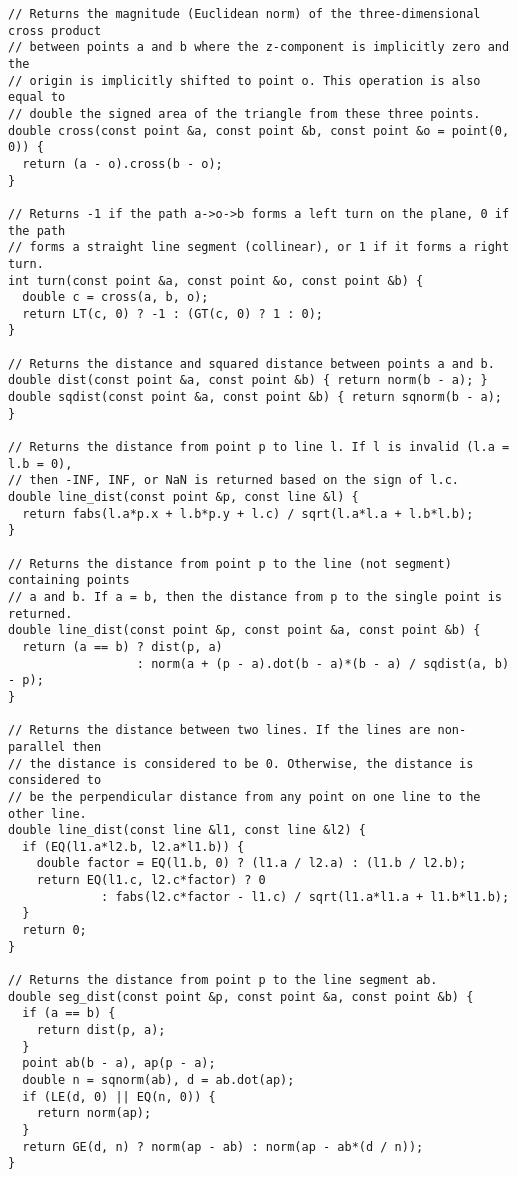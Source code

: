 \begin{lstlisting}
// Returns the magnitude (Euclidean norm) of the three-dimensional cross product
// between points a and b where the z-component is implicitly zero and the
// origin is implicitly shifted to point o. This operation is also equal to
// double the signed area of the triangle from these three points.
double cross(const point &a, const point &b, const point &o = point(0, 0)) {
  return (a - o).cross(b - o);
}

// Returns -1 if the path a->o->b forms a left turn on the plane, 0 if the path
// forms a straight line segment (collinear), or 1 if it forms a right turn.
int turn(const point &a, const point &o, const point &b) {
  double c = cross(a, b, o);
  return LT(c, 0) ? -1 : (GT(c, 0) ? 1 : 0);
}

// Returns the distance and squared distance between points a and b.
double dist(const point &a, const point &b) { return norm(b - a); }
double sqdist(const point &a, const point &b) { return sqnorm(b - a); }

// Returns the distance from point p to line l. If l is invalid (l.a = l.b = 0),
// then -INF, INF, or NaN is returned based on the sign of l.c.
double line_dist(const point &p, const line &l) {
  return fabs(l.a*p.x + l.b*p.y + l.c) / sqrt(l.a*l.a + l.b*l.b);
}

// Returns the distance from point p to the line (not segment) containing points
// a and b. If a = b, then the distance from p to the single point is returned.
double line_dist(const point &p, const point &a, const point &b) {
  return (a == b) ? dist(p, a)
                  : norm(a + (p - a).dot(b - a)*(b - a) / sqdist(a, b) - p);
}

// Returns the distance between two lines. If the lines are non-parallel then
// the distance is considered to be 0. Otherwise, the distance is considered to
// be the perpendicular distance from any point on one line to the other line.
double line_dist(const line &l1, const line &l2) {
  if (EQ(l1.a*l2.b, l2.a*l1.b)) {
    double factor = EQ(l1.b, 0) ? (l1.a / l2.a) : (l1.b / l2.b);
    return EQ(l1.c, l2.c*factor) ? 0
             : fabs(l2.c*factor - l1.c) / sqrt(l1.a*l1.a + l1.b*l1.b);
  }
  return 0;
}

// Returns the distance from point p to the line segment ab.
double seg_dist(const point &p, const point &a, const point &b) {
  if (a == b) {
    return dist(p, a);
  }
  point ab(b - a), ap(p - a);
  double n = sqnorm(ab), d = ab.dot(ap);
  if (LE(d, 0) || EQ(n, 0)) {
    return norm(ap);
  }
  return GE(d, n) ? norm(ap - ab) : norm(ap - ab*(d / n));
}


\end{lstlisting}
